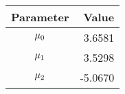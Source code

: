 \begin{tabular}{cr}
\hline
\textbf{Parameter} &  \textbf{Value} 
\\ \hline
 $\mu_0$ & 3.6581
\\ 
 $\mu_1$ & 3.5298
 \\
 $\mu_2$ & -5.0670
\\ \hline
\end{tabular}